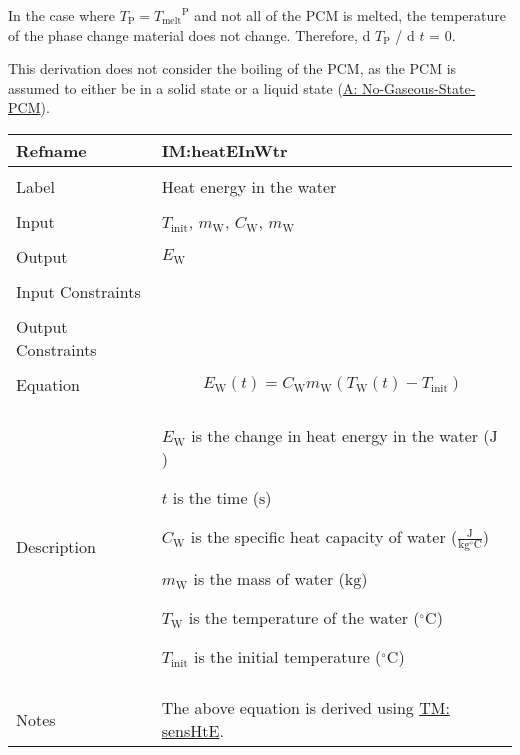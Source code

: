 \documentclass[12pt]{article}
\begin{document}
In the case where ${T_{\text{P}}}={{T_{\text{melt}}}^{\text{P}}}$ and not all of the PCM is melted, the temperature of the phase change material does not change. Therefore, d ${T_{\text{P}}}$ / d $t$ = 0.

This derivation does not consider the boiling of the PCM, as the PCM is assumed to either be in a solid state or a liquid state (\hyperref[assumpNGSP]{A: No-Gaseous-State-PCM}).

\vspace{\baselineskip}
\noindent
\begin{minipage}{\textwidth}
\begin{tabular}{>{\raggedright}p{}>{\raggedright\arraybackslash}p{}}
\toprule \textbf{Refname} & \textbf{IM:heatEInWtr}
\label{IM:heatEInWtr}
\\ \midrule \\
Label & Heat energy in the water
        
\\ \midrule \\
Input & ${T_{\text{init}}}$, ${m_{\text{W}}}$, ${C_{\text{W}}}$, ${m_{\text{W}}}$
        
\\ \midrule \\
Output & ${E_{\text{W}}}$
         
\\ \midrule \\
Input Constraints & 
\\ \midrule \\
Output Constraints & 
\\ \midrule \\
Equation & \begin{displaymath}
           {E_{\text{W}}}\left(t\right)={C_{\text{W}}} {m_{\text{W}}} \left({T_{\text{W}}}\left(t\right)-{T_{\text{init}}}\right)
           \end{displaymath}
\\ \midrule \\
Description & \begin{symbDescription}
              \item{${E_{\text{W}}}$ is the change in heat energy in the water (${\text{J}}$)}
              \item{$t$ is the time (${\text{s}}$)}
              \item{${C_{\text{W}}}$ is the specific heat capacity of water ($\frac{\text{J}}{\text{kg}{}^{\circ}\text{C}}$)}
              \item{${m_{\text{W}}}$ is the mass of water (${\text{kg}}$)}
              \item{${T_{\text{W}}}$ is the temperature of the water (${{}^{\circ}\text{C}}$)}
              \item{${T_{\text{init}}}$ is the initial temperature (${{}^{\circ}\text{C}}$)}
              \end{symbDescription}
\\ \midrule \\
Notes & The above equation is derived using \hyperref[TM:sensHtE]{TM: sensHtE}.
        

\end{tabular}
\end{minipage}
\end{document}
